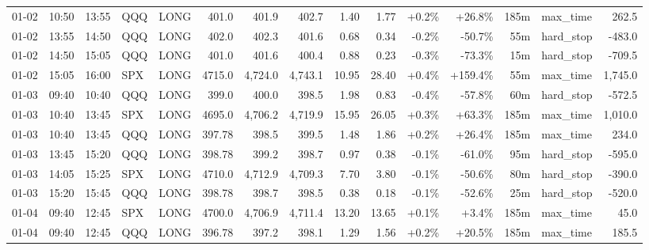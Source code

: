 \documentclass[11pt,a4paper,twoside]{article}
\begin{document}
\begin{landscape}
\begin{center}
\begin{longtable}{>{\color{txtmain}}l l l l l r r r r r r r r >{\color{txtmain}}l r}
01-02 & 10:50 & 13:55 & QQQ & LONG & 401.0 & 401.9 & 402.7 & 1.40 & 1.77 & \textcolor{wingreen}{+0.2\%} & \textcolor{wingreen}{+26.8\%} & 185m & max\_time & \textcolor{wingreen}{262.5} \\
01-02 & 13:55 & 14:50 & QQQ & LONG & 402.0 & 402.3 & 401.6 & 0.68 & 0.34 & \textcolor{lossred}{-0.2\%} & \textcolor{lossred}{-50.7\%} & 55m & hard\_stop & \textcolor{lossred}{-483.0} \\
01-02 & 14:50 & 15:05 & QQQ & LONG & 401.0 & 401.6 & 400.4 & 0.88 & 0.23 & \textcolor{lossred}{-0.3\%} & \textcolor{lossred}{-73.3\%} & 15m & hard\_stop & \textcolor{lossred}{-709.5} \\
01-02 & 15:05 & 16:00 & SPX & LONG & 4715.0 & 4,724.0 & 4,743.1 & 10.95 & 28.40 & \textcolor{wingreen}{+0.4\%} & \textcolor{wingreen}{+159.4\%} & 55m & max\_time & \textcolor{wingreen}{1,745.0} \\
01-03 & 09:40 & 10:40 & QQQ & LONG & 399.0 & 400.0 & 398.5 & 1.98 & 0.83 & \textcolor{lossred}{-0.4\%} & \textcolor{lossred}{-57.8\%} & 60m & hard\_stop & \textcolor{lossred}{-572.5} \\
01-03 & 10:40 & 13:45 & SPX & LONG & 4695.0 & 4,706.2 & 4,719.9 & 15.95 & 26.05 & \textcolor{wingreen}{+0.3\%} & \textcolor{wingreen}{+63.3\%} & 185m & max\_time & \textcolor{wingreen}{1,010.0} \\
01-03 & 10:40 & 13:45 & QQQ & LONG & 397.78 & 398.5 & 399.5 & 1.48 & 1.86 & \textcolor{wingreen}{+0.2\%} & \textcolor{wingreen}{+26.4\%} & 185m & max\_time & \textcolor{wingreen}{234.0} \\
01-03 & 13:45 & 15:20 & QQQ & LONG & 398.78 & 399.2 & 398.7 & 0.97 & 0.38 & \textcolor{lossred}{-0.1\%} & \textcolor{lossred}{-61.0\%} & 95m & hard\_stop & \textcolor{lossred}{-595.0} \\
01-03 & 14:05 & 15:25 & SPX & LONG & 4710.0 & 4,712.9 & 4,709.3 & 7.70 & 3.80 & \textcolor{lossred}{-0.1\%} & \textcolor{lossred}{-50.6\%} & 80m & hard\_stop & \textcolor{lossred}{-390.0} \\
01-03 & 15:20 & 15:45 & QQQ & LONG & 398.78 & 398.7 & 398.5 & 0.38 & 0.18 & \textcolor{lossred}{-0.1\%} & \textcolor{lossred}{-52.6\%} & 25m & hard\_stop & \textcolor{lossred}{-520.0} \\
01-04 & 09:40 & 12:45 & SPX & LONG & 4700.0 & 4,706.9 & 4,711.4 & 13.20 & 13.65 & \textcolor{wingreen}{+0.1\%} & \textcolor{wingreen}{+3.4\%} & 185m & max\_time & \textcolor{wingreen}{45.0} \\
01-04 & 09:40 & 12:45 & QQQ & LONG & 396.78 & 397.2 & 398.1 & 1.29 & 1.56 & \textcolor{wingreen}{+0.2\%} & \textcolor{wingreen}{+20.5\%} & 185m & max\_time & \textcolor{wingreen}{185.5} \\

\end{longtable}
\end{center}
\end{landscape}
\end{document}
